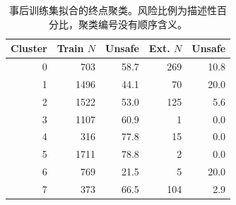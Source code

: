 \begin{table}[t]
\centering\footnotesize
\caption{事后训练集拟合的终点聚类。风险比例为描述性百分比，聚类编号没有顺序含义。}\label{tab:clusters}
\begin{tabular}{rrrrr}\toprule
Cluster & Train $N$ & Unsafe & Ext. $N$ & Unsafe \\
\midrule
0 & 703 & 58.7 & 269 & 10.8 \\
1 & 1496 & 44.1 & 70 & 20.0 \\
2 & 1522 & 53.0 & 125 & 5.6 \\
3 & 1107 & 60.9 & 1 & 0.0 \\
4 & 316 & 77.8 & 15 & 0.0 \\
5 & 1711 & 78.8 & 2 & 0.0 \\
6 & 769 & 21.5 & 5 & 20.0 \\
7 & 373 & 66.5 & 104 & 2.9 \\
\bottomrule\end{tabular}
\end{table}
